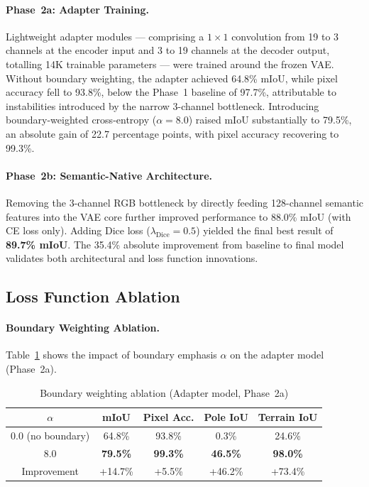 \paragraph{Phase~2a: Adapter Training.}
Lightweight adapter modules — comprising a $1 \times 1$ convolution from 19 to 3 channels at the encoder input and 3 to 19 channels at the decoder output, totalling 14K trainable parameters — were trained around the frozen VAE. Without boundary weighting, the adapter achieved 64.8\% mIoU, while pixel accuracy fell to 93.8\%, below the Phase~1 baseline of 97.7\%, attributable to instabilities introduced by the narrow 3-channel bottleneck. Introducing boundary-weighted cross-entropy ($\alpha=8.0$) raised mIoU substantially to 79.5\%, an absolute gain of 22.7 percentage points, with pixel accuracy recovering to 99.3\%.

\paragraph{Phase~2b: Semantic-Native Architecture.}
Removing the 3-channel RGB bottleneck by directly feeding 128-channel semantic features into the VAE core further improved performance to 88.0\% mIoU (with CE loss only). Adding Dice loss ($\lambda_{\text{Dice}}=0.5$) yielded the final best result of \textbf{89.7\% mIoU}. The 35.4\% absolute improvement from baseline to final model validates both architectural and loss function innovations.

\subsection{Loss Function Ablation}
\label{subsec:loss_ablation}

\paragraph{Boundary Weighting Ablation.}
Table~\ref{tab:boundary_ablation} shows the impact of boundary emphasis $\alpha$ on the adapter model (Phase~2a).

\begin{table}[t]
    \centering
    \caption{Boundary weighting ablation (Adapter model, Phase~2a)}
    \label{tab:boundary_ablation}
    \begin{tabular}{ccccc}
        \toprule
        $\alpha$ & \textbf{mIoU} & \textbf{Pixel Acc.} & \textbf{Pole IoU} & \textbf{Terrain IoU} \\
        \midrule
        0.0 (no boundary) & 64.8\% & 93.8\% & 0.3\% & 24.6\% \\
        8.0 & \textbf{79.5\%} & \textbf{99.3\%} & \textbf{46.5\%} & \textbf{98.0\%} \\
        \midrule
        Improvement & +14.7\% & +5.5\% & +46.2\% & +73.4\% \\
        \bottomrule
    \end{tabular}
\end{table}

